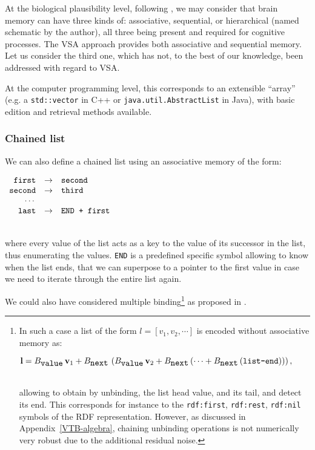 \documentclass[sn-mathphys]{sn-jnl}
\newcommand{\eqline}[1]{~\vspace{0.1cm}\\\centerline{$#1$}\vspace{0.1cm}\\}
\begin{document}
\begin{appendices}
At the biological plausibility level, following \cite{eichenbaum_memory_2017}, we may consider that brain memory can have three kinds of: associative, sequential, or hierarchical (named schematic by the author), all three being present and required for cognitive processes. The VSA approach provides both associative and sequential memory. Let us consider the third one, which has not, to the best of our knowledge, been addressed with regard to VSA.

At the computer programming level, this corresponds to an extensible ``array'' (e.g. a {\tt std::vector} in C++ or {\tt java.util.AbstractList} in Java), with basic edition and retrieval methods available.

\subsubsection{Chained list}

We can also define a chained list using an associative memory of the form:
  \eqline{\begin{array}{rcl}
      \mbox{\tt first} &\rightarrow& \mbox{\tt second} \\
      \mbox{\tt second} &\rightarrow& \mbox{\tt third} \\
      \cdots & \\
      \mbox{\tt last} &\rightarrow& \mbox{\tt END + first}
    \end{array}}
where every value of the list acts as a key to the value of its successor in the list, thus enumerating the values. {\tt END} is a predefined specific symbol allowing to know when the list ends, that we can superpose to a pointer to the first value in case we need to iterate through the entire list again.

We could also have considered multiple binding\footnote{In such a case a list of the form $l = [v_1, v_2, \cdots]$ is encoded without associative memory as: \eqline{\mathbf{l} = B_{\mbox{\tt value}} \, \mathbf{v}_1 + B_{\mbox{\tt next}} \, \left(B_{\mbox{\tt value}} \, \mathbf{v}_2 + B_{\mbox{\tt next}}\left(\cdots + B_{\mbox{\tt next}}\left(\mbox{\tt list-end}\right)\right)\right),}
allowing to obtain by unbinding, the list head value, and its tail, and detect its end. This corresponds for instance to the {\tt rdf:first}, {\tt rdf:rest}, {\tt rdf:nil} symbols of the RDF representation. However, as discussed in Appendix~\ref{VTB-algebra}, chaining unbinding operations is not numerically very robust due to the additional residual noise.} as proposed in \cite{mercier_ontology_2021}.
 

\end{appendices}
\end{document}
